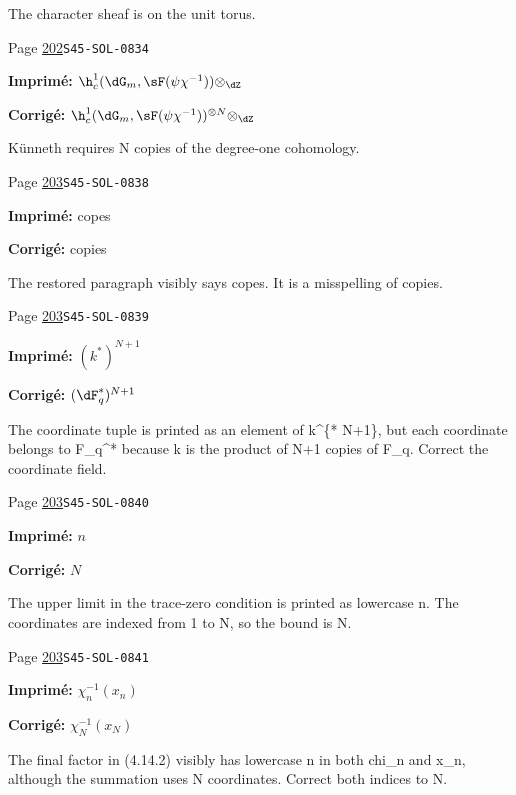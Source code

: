 \begin{description}
\par\noindent The character sheaf is on the unit torus.
\smallskip
\item[\hypertarget{apparatus:FR-0188}{188}] Page \hyperlink{printpage:fr:202}{202}\quad\texttt{S45-SOL-0834}
\par\noindent\textbf{Imprimé:} \(\h_c^1(\dG_m,\sF(\psi\chi^{-1})) \otimes_\dZ\)
\par\noindent\textbf{Corrigé:} \(\h_c^1(\dG_m,\sF(\psi\chi^{-1}))^{\otimes N} \otimes_\dZ\)
\par\noindent Künneth requires N copies of the degree-one cohomology.
\smallskip
\item[\hypertarget{apparatus:FR-0189}{189}] Page \hyperlink{printpage:fr:203}{203}\quad\texttt{S45-SOL-0838}
\par\noindent\textbf{Imprimé:} copes
\par\noindent\textbf{Corrigé:} copies
\par\noindent The restored paragraph visibly says copes. It is a misspelling of copies.
\smallskip
\item[\hypertarget{apparatus:FR-0190}{190}] Page \hyperlink{printpage:fr:203}{203}\quad\texttt{S45-SOL-0839}
\par\noindent\textbf{Imprimé:} \((k^\ast)^{N+1}\)
\par\noindent\textbf{Corrigé:} \((\dF_q^\ast)^{N+1}\)
\par\noindent The coordinate tuple is printed as an element of k\textasciicircum{}\{* N+1\}, but each coordinate belongs to F\_q\textasciicircum{}* because k is the product of N+1 copies of F\_q. Correct the coordinate field.
\smallskip
\item[\hypertarget{apparatus:FR-0191}{191}] Page \hyperlink{printpage:fr:203}{203}\quad\texttt{S45-SOL-0840}
\par\noindent\textbf{Imprimé:} \(n\)
\par\noindent\textbf{Corrigé:} \(N\)
\par\noindent The upper limit in the trace-zero condition is printed as lowercase n. The coordinates are indexed from 1 to N, so the bound is N.
\smallskip
\item[\hypertarget{apparatus:FR-0192}{192}] Page \hyperlink{printpage:fr:203}{203}\quad\texttt{S45-SOL-0841}
\par\noindent\textbf{Imprimé:} \(\chi_n^{-1}(x_n)\)
\par\noindent\textbf{Corrigé:} \(\chi_N^{-1}(x_N)\)
\par\noindent The final factor in (4.14.2) visibly has lowercase n in both chi\_n and x\_n, although the summation uses N coordinates. Correct both indices to N.

\end{description}
